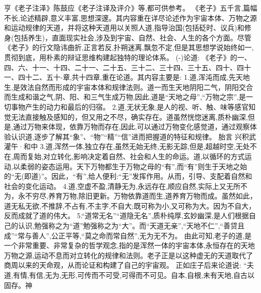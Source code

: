\documentclass[a4paper,12pt,UTF8,twoside]{ctexbook}
\begin{document}
亨《老子注泽》陈鼓应《老子注译及评介》等,都可供参考。
《老子》五千言,篇幅不长,论述精辟,意义丰富,思想深邃。其内容重在详尽论述作为宇宙本体、万物之源和运动规律的天道，并将这种天道用以关照人道,指导治国(包括砭时、议兵)和修身(包括养生)，直面现实社会,涉及到宇宙、自然、社会、人生的各个方面。尽管《老子》的行文隐讳曲折,正言若反,扑朔迷离,飘忽不定,但是其思想学说始终如一,贯彻到底，用朴素的辩证思维构建起独特的理论体系。
(-)论道:
《老子》的一、四、六、十一、十四、二十一、二十五、三十二、三十四、三十五、四十、四十一、四十二、五十-章,共十四章,重在论道。其内容主要是:
1.道,浑沌而成,先天地生,是效法自然而形成的宇宙本体和规律法则。道一而生天地阴阳二气，阴阳交合而生成和谐之气,阴、阳、和三气生成万物,因此,道是“天地之母”,“万物之宗”,是一切事物产生的动力和最后的归宿。
2.道,无状无象,是人的视、听、触、味等感官知觉无法直接触及感知的，但又用之不尽，确实存在。道虽然恍惚迷离,质朴幽深,但是,通过万物来体现，依靠万物而存在,因此,可以通过万物变化感觉道，通过观察体验认识道,逐步了解其“象”、“物”“精”“信”进而把握道的特征和规律。
胎言
兴积武灌午·和中
3.道,浑然一体,独立存在,虽然无始无终,无影无踪,但是,超越时空,无处不在,周而复始,对立转化,影响决定着自然、社会和人生的命运。道,以循环的方式运动,以柔弱的姿态运用。天下万物都生于万物之母的“有”,而“有”则生于天地之始的“无(即道)”。因此，“有”,给人便利:“无”发挥作用。从而，引导、支配着自然和社会的变化运动。
4.道,空虚不盈,清静无为,永远存在,顺应自然,实际上又无所不为，永不穷尽,养育万物,除旧更新。万物依靠道而生,道养育万物而成。虽然如此，道无私无欲,不推辞,不占有,不主字,不自大;既可称为小,又可称为大。因为不自大，反而成就了道的伟大。
5.“道常无名”“道隐无名”,质朴纯厚,玄妙幽深,是人们根据自己的认识,勉强称之为“道”勉强称之为“大”。而“天道无亲”,“天地不仁”,“善贷且成”“常与善人”,公正平等,“莫之命而常自然”,无为无不为。
由此可知,老子的道,是一个非常重要、非常复杂的哲学观念,指的是浑然一体的宇宙本体,永恒存在的天地万物之源,运动不息而对立转化的规律和法则。老子正是以这种虚无的天道取代了商周以来的天命观，从而论证和构建了自己的宇宙观。
正如庄子后来论道说:
“夫道,有情,有信,无为,无形,可传而不可受,可得而不可见。自本,自根,未有天地,自古以固存。神
\end{document}
